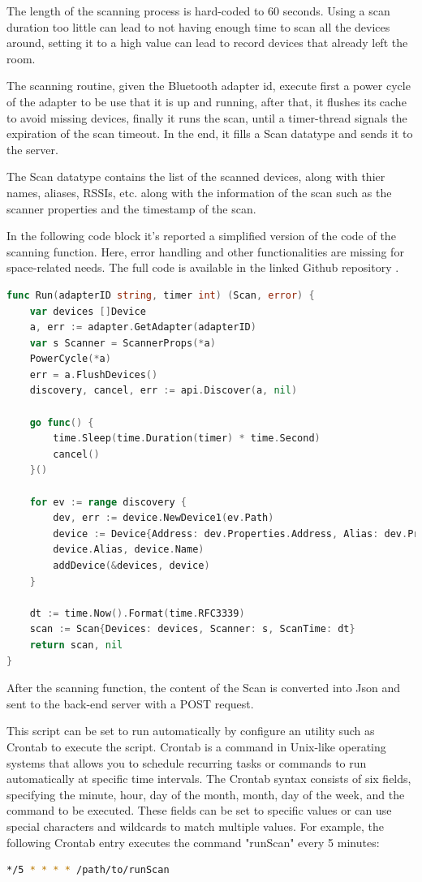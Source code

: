 \documentclass[a4paper, 11pt]{article}
\begin{document}
The length of the scanning process is hard-coded to 60 seconds. Using a scan duration too little can lead to not having enough time to scan all the devices around, setting it to a high value can lead to record devices that already left the room.

The scanning routine, given the Bluetooth adapter id, execute first a power cycle of the adapter to be use that it is up and running, after that, it flushes its cache to avoid missing devices, finally it runs the scan, until a timer-thread signals the expiration of the scan timeout. In the end, it fills a Scan datatype and sends it to the server.

The Scan datatype contains the list of the scanned devices, along with thier names, aliases, RSSIs, etc. along with the information of the scan such as the scanner properties and the timestamp of the scan.

In the following code block it's reported a simplified version of the code of the scanning function. Here, error handling and other functionalities are missing for space-related needs. The full code is available in the linked Github repository \cite{repo}. 


\begin{lstlisting}[language=Go]
func Run(adapterID string, timer int) (Scan, error) {
	var devices []Device
	a, err := adapter.GetAdapter(adapterID)
	var s Scanner = ScannerProps(*a)
	PowerCycle(*a)
	err = a.FlushDevices()
	discovery, cancel, err := api.Discover(a, nil)

	go func() {
		time.Sleep(time.Duration(timer) * time.Second)
		cancel()
	}()

	for ev := range discovery {
		dev, err := device.NewDevice1(ev.Path)
		device := Device{Address: dev.Properties.Address, Alias: dev.Properties.Alias, Name: dev.Properties.Name, RSSI: dev.Properties.RSSI, TxPower: dev.Properties.TxPower}
		device.Alias, device.Name)
		addDevice(&devices, device)
	}

	dt := time.Now().Format(time.RFC3339)
	scan := Scan{Devices: devices, Scanner: s, ScanTime: dt}
	return scan, nil
}

\end{lstlisting}

After the scanning function, the content of the Scan is converted into Json and sent to the back-end server with a POST request.

This script can be set to run automatically by configure an utility such as Crontab to execute the script. Crontab is a command in Unix-like operating systems that allows you to schedule recurring tasks or commands to run automatically at specific time intervals. The Crontab syntax consists of six fields, specifying the minute, hour, day of the month, month, day of the week, and the command to be executed. These fields can be set to specific values or can use special characters and wildcards to match multiple values. For example, the following Crontab entry executes the command "runScan" every 5 minutes:
\begin{lstlisting}[language=Bash]
*/5 * * * * /path/to/runScan
\end{lstlisting}
\end{document}
